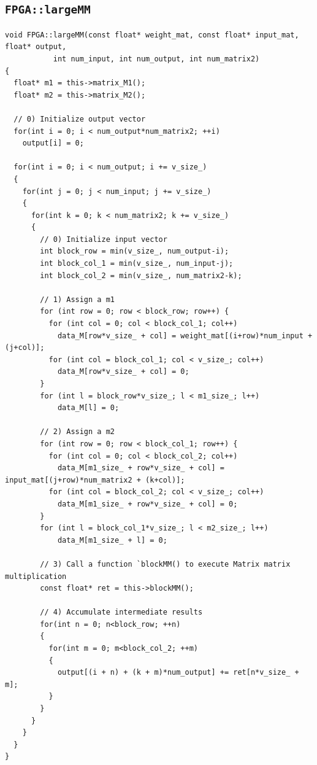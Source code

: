 \documentclass{article}
\begin{document}
\subsection*{\texttt{FPGA::largeMM}}
\begin{lstlisting}[style={c-style}]
void FPGA::largeMM(const float* weight_mat, const float* input_mat, float* output, 
		   int num_input, int num_output, int num_matrix2)
{
  float* m1 = this->matrix_M1();
  float* m2 = this->matrix_M2();

  // 0) Initialize output vector		
  for(int i = 0; i < num_output*num_matrix2; ++i)
    output[i] = 0;

  for(int i = 0; i < num_output; i += v_size_)
  {
    for(int j = 0; j < num_input; j += v_size_)
    {
      for(int k = 0; k < num_matrix2; k += v_size_)
      {
        // 0) Initialize input vector
        int block_row = min(v_size_, num_output-i);
        int block_col_1 = min(v_size_, num_input-j);
        int block_col_2 = min(v_size_, num_matrix2-k);

        // 1) Assign a m1
        for (int row = 0; row < block_row; row++) {
          for (int col = 0; col < block_col_1; col++)
            data_M[row*v_size_ + col] = weight_mat[(i+row)*num_input + (j+col)];
          for (int col = block_col_1; col < v_size_; col++)
            data_M[row*v_size_ + col] = 0;
      	}
        for (int l = block_row*v_size_; l < m1_size_; l++)
            data_M[l] = 0;

        // 2) Assign a m2
        for (int row = 0; row < block_col_1; row++) {
          for (int col = 0; col < block_col_2; col++)
            data_M[m1_size_ + row*v_size_ + col] = input_mat[(j+row)*num_matrix2 + (k+col)];
          for (int col = block_col_2; col < v_size_; col++)
            data_M[m1_size_ + row*v_size_ + col] = 0;
      	}
        for (int l = block_col_1*v_size_; l < m2_size_; l++)
            data_M[m1_size_ + l] = 0;

        // 3) Call a function `blockMM() to execute Matrix matrix multiplication
        const float* ret = this->blockMM();

        // 4) Accumulate intermediate results
        for(int n = 0; n<block_row; ++n)
        {
          for(int m = 0; m<block_col_2; ++m)
          {
            output[(i + n) + (k + m)*num_output] += ret[n*v_size_ + m];
          }
        }
      }
    } 
  }
}
\end{lstlisting}
\end{document}
